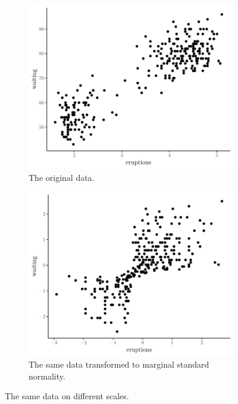 \begin{figure}[t]
    \centering
    \begin{subfigure}[t]{0.48\textwidth}
      \includegraphics[width=\textwidth]{faithful}
      \caption{The original data.}
    \end{subfigure}
    \begin{subfigure}[t]{0.48\textwidth}
      \includegraphics[width=\textwidth]{faithful-transformed}
      \caption{The same data transformed to marginal standard normality.}
    \end{subfigure}
    \caption{The same data on different scales.}
    \label{fig:faithful}
  \end{figure}


